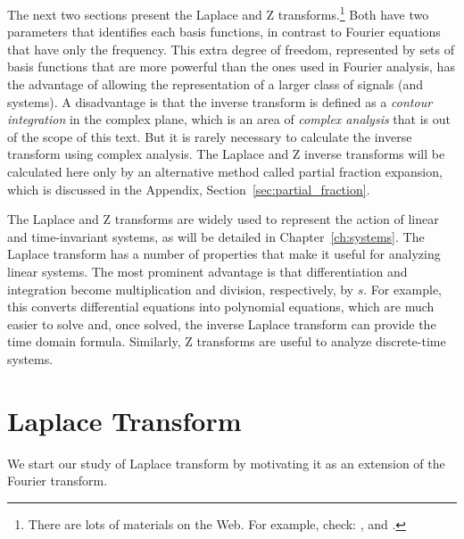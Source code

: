 The next two sections present the Laplace and Z transforms.\footnote{There are lots of materials on the Web. For example, check:
,  and .}
 Both have two parameters that identifies each basis functions, in contrast to Fourier equations that have only the frequency. This extra degree of freedom, represented by sets of basis functions that are more powerful than the ones used in Fourier analysis, has the advantage of allowing the representation of a larger class of signals (and systems). A disadvantage is that the inverse transform is defined as a \emph{contour integration} in the complex plane, which is an area of \emph{complex analysis} that is out of the scope of this text. But it is rarely necessary to calculate the inverse transform using complex analysis. The Laplace and Z inverse transforms will be calculated here only by an alternative method called partial fraction expansion, which is discussed in the Appendix, Section~\ref{sec:partial_fraction}.

The Laplace and Z transforms are widely used to represent the action of linear and time-invariant systems, as will be detailed in Chapter~\ref{ch:systems}.
The Laplace transform has a number of properties that make it useful for analyzing linear systems. The most prominent advantage is that differentiation and integration become multiplication and division, respectively, by $s$. For example, this converts differential equations into polynomial equations, which are much easier to solve and, once solved, the inverse Laplace transform can provide the time domain formula. Similarly, Z transforms are useful to analyze discrete-time systems.



\section{Laplace Transform}

We start our study of Laplace transform by motivating it as an extension of the Fourier transform.

